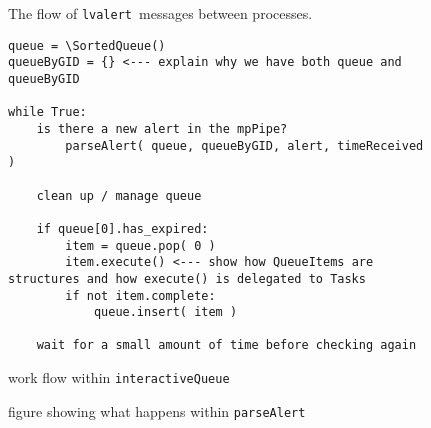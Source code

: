 \documentclass{article}
\newcommand{\alert}{\texttt{lvalert}~}
\newcommand{\interactiveQueue}{\texttt{interactiveQueue}~}
\newcommand{\parseAlert}{\texttt{parseAlert}~}
\newcommand{\SortedQueue}{\texttt{SortedQueue}~}
\begin{document}
\begin{figure}
    \caption{The flow of \alert messages between processes.}
    \label{fig: alert flow}
\end{figure}


\begin{figure}

\begin{verbatim}
queue = \SortedQueue()
queueByGID = {} <--- explain why we have both queue and queueByGID

while True:
    is there a new alert in the mpPipe?
        parseAlert( queue, queueByGID, alert, timeReceived )

    clean up / manage queue

    if queue[0].has_expired:
        item = queue.pop( 0 )
        item.execute() <--- show how QueueItems are structures and how execute() is delegated to Tasks
        if not item.complete:
            queue.insert( item )

    wait for a small amount of time before checking again
\end{verbatim}

    \caption{work flow within \interactiveQueue}
    \label{fig: interactiveQueue}
\end{figure}

\begin{figure}

    \caption{figure showing what happens within \parseAlert}
    \label{fig: parseAlert}
\end{figure}


\end{document}
